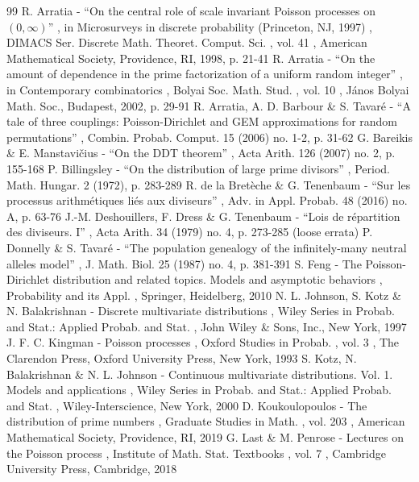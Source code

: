 \documentclass[11pt]{article}
\theoremstyle{plain}
\theoremstyle{definition}
\begin{document}
\begin{thebibliography}{99}
 R. Arratia - “On the central role of scale invariant Poisson processes on $(0,\infty )$” , in Microsurveys in discrete probability (Princeton, NJ, 1997) , DIMACS Ser. Discrete Math. Theoret. Comput. Sci. , vol. 41 , American Mathematical Society, Providence, RI, 1998, p. 21-41
 R. Arratia - “On the amount of dependence in the prime factorization of a uniform random integer” , in Contemporary combinatorics , Bolyai Soc. Math. Stud. , vol. 10 , János Bolyai Math. Soc., Budapest, 2002, p. 29-91
 R. Arratia, A. D. Barbour \& S. Tavaré - “A tale of three couplings: Poisson-Dirichlet and GEM approximations for random permutations” , Combin. Probab. Comput. 15 (2006) no. 1-2, p. 31-62
 G. Bareikis \& E. Manstavičius - “On the DDT theorem” , Acta Arith. 126 (2007) no. 2, p. 155-168
 P. Billingsley - “On the distribution of large prime divisors” , Period. Math. Hungar. 2 (1972), p. 283-289
 R. de la Bretèche \& G. Tenenbaum - “Sur les processus arithmétiques liés aux diviseurs” , Adv. in Appl. Probab. 48 (2016) no. A, p. 63-76
 J.-M. Deshouillers, F. Dress \& G. Tenenbaum - “Lois de répartition des diviseurs. I” , Acta Arith. 34 (1979) no. 4, p. 273-285 (loose errata)
 P. Donnelly \& S. Tavaré - “The population genealogy of the infinitely-many neutral alleles model” , J. Math. Biol. 25 (1987) no. 4, p. 381-391
 S. Feng - The Poisson-Dirichlet distribution and related topics. Models and asymptotic behaviors , Probability and its Appl. , Springer, Heidelberg, 2010
 N. L. Johnson, S. Kotz \& N. Balakrishnan - Discrete multivariate distributions , Wiley Series in Probab. and Stat.: Applied Probab. and Stat. , John Wiley \& Sons, Inc., New York, 1997
 J. F. C. Kingman - Poisson processes , Oxford Studies in Probab. , vol. 3 , The Clarendon Press, Oxford University Press, New York, 1993
 S. Kotz, N. Balakrishnan \& N. L. Johnson - Continuous multivariate distributions. Vol. 1. Models and applications , Wiley Series in Probab. and Stat.: Applied Probab. and Stat. , Wiley-Interscience, New York, 2000
 D. Koukoulopoulos - The distribution of prime numbers , Graduate Studies in Math. , vol. 203 , American Mathematical Society, Providence, RI, 2019
 G. Last \& M. Penrose - Lectures on the Poisson process , Institute of Math. Stat. Textbooks , vol. 7 , Cambridge University Press, Cambridge, 2018

\end{thebibliography}
\end{document}
